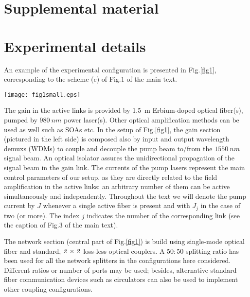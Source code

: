 \documentclass[aps,prl,twocolumn,showpacs,amsmath,amssymb,floatfix,superscriptaddress,
]{revtex4-1}
\begin{document}
\newpage
\section{Supplemental material}
\section{Experimental details}

An example of the experimental configuration is presented in Fig.\ref{fig1}, 
corresponding to the scheme (c) of Fig.1 of the main text. 


\begin{figure*}
\texttt{[image: fig1small.eps]}
\caption{(Color online) Setup for the case of Fig.1c of the main text. Left, (oriented) active block composed by a $980~nm$ pumped, $Er^{3+}$ fiber, $WDM$s combining and separating pump and $1.55~\mu m$ signals and an optical isolator. This scheme is represented  as arrowed (red) segments in Fig.1 of the main text.  Center, the rest of the network. Right, the frequency and time-domain detection/acquisition section. }
\label{fig1}
\end{figure*}



The gain in the active links is provided by 1.5~m Erbium-doped optical fiber(s), pumped by $980~nm$ power laser(s). Other optical amplification methods can be used as well such as SOAs etc.
In the setup of Fig.\ref{fig1}, the gain section (pictured in the left side) is composed also by input and output wavelength demuxs (WDMs) to couple and decouple the pump beam to/from the $1550~nm$ signal beam. An optical isolator assures the unidirectional propagation of the signal beam in the gain link. The currents of the pump lasers represent the main control parameters of our setup, as they are directly related to the field amplification in the active links: an arbitrary number of them can be active simultaneously and independently. Throughout the text we will denote the pump current by $J$ whenever a single active fiber is present and with $J_j$ in the case of two (or more). The index $j$ indicates the number of the corresponding link (see the caption of Fig.3 of the main text).

The network section (central part of Fig.\ref{fig1}) is build using single-mode optical fiber and standard, ${\it 2\times2}$ loss-less optical couplers. A ${50:50}$ splitting ratio has been used for all the network splitters in the configurations here considered. Different ratios or number of ports may be used; besides, alternative standard fiber communication devices such as circulators can also be used to implement other coupling configurations. 
\end{document}
